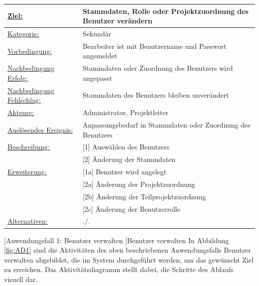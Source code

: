 \begin{tabularx}{\textwidth}{|p{}|p{}|}
        \hline
        \underline{Ziel:} & Stammdaten, Rolle oder Projektzuordnung des Benutzer verändern \\\hline
        \underline{Kategorie:} & Sekundär \\\hline
        \underline{Vorbedingung:} & Bearbeiter ist mit Benutzername und Passwort angemeldet \\\hline
        \underline{Nachbedingung Erfolg:} & Stammdaten oder Zuordnung des Benutzers wird angepasst \\\hline
        \underline{Nachbedingung Fehlschlag:} & Stammdaten des Benutzers bleiben unverändert \\\hline
        \underline{Akteure:} & Administrator, Projektleiter \\\hline
        \underline{Auslösendes Ereignis:} & Anpassungsbedarf in Stammdaten oder Zuordnung des Benutzers\\\hline        
        \multirow{1}{*}{\underline{Beschreibung:}} & [1] Auswählen des Benutzers \\
        & [2] Änderung der Stammdaten \\\hline
        \multirow{1}{*}{\underline{Erweiterung:}} & [1a] Benutzer wird angelegt \\
        & [2a] Änderung der Projektzuordnung \\
        & [2b] Änderung der Teilprojektzuordnung \\
        & [2c] Änderung der Benutzerrolle \\\hline
        \underline{Alternativen:} & ./. \\\hline
\end{tabularx}
[Anwendungsfall 1: Benutzer verwalten ]{Benutzer verwalten}
\newpage
In Abbildung \ref{fig:AD1} sind die Aktivitäten des oben beschriebenen Anwendungsfalls \glqq{}Benutzer verwalten\grqq{} abgebildet, die im System durchgeführt werden, um das gewünscht Ziel zu erreichen. Das Aktivitätsdiagramm stellt dabei, die Schritte des Ablaufs visuell dar.

